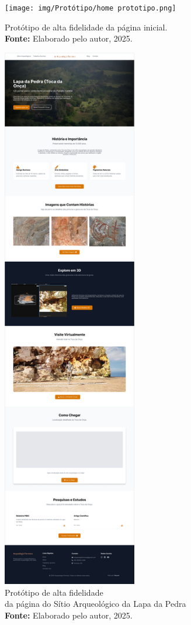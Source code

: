\begin{figure}[H]
    \centering
    \begin{minipage}[b]{0.48\textwidth}
        \centering
        \texttt{[image: img/Protótipo/home prototipo.png]}
        \caption{Protótipo de alta fidelidade da página inicial. \\
            \textbf{Fonte:} Elaborado pelo autor, 2025.}
        \label{fig:prototipo_home}
    \end{minipage}
    \hfill
    \begin{minipage}[b]{0.48\textwidth}
        \centering
        \includegraphics[height=24cm, keepaspectratio]{img/Protótipo/prototipo alta fidelidade toca da onça.png}
        \caption{Protótipo de alta fidelidade \\da página do Sítio Arqueológico da Lapa da Pedra \\
            \textbf{Fonte:} Elaborado pelo autor, 2025.}
        \label{fig:prototipo_lapadapedra}
    \end{minipage}
\end{figure}

